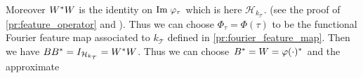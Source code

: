 Moreover $W^* W$ is the identity on
$\Ima \Phi_{\tau}$ which is here $\mathcal{H}_{k_{\mathcal{T}}}$. (see the
proof of \cref{pr:feature_operator} and \citet{Carmeli2010}). Thus we can
choose $\Phi_\tau=\Phi(\tau)$ to be the functional Fourier feature map
associated to $k_{\mathcal{T}}$ defined in \cref{pr:fourier_feature_map}.  Then
we have $BB^* = I_{\mathcal{H}_{k_{\mathcal{T}}}} = W^* W$.  Thus
we can choose $B^\adjoint = W = \Phi(\cdot)^\adjoint$ and the approximate
